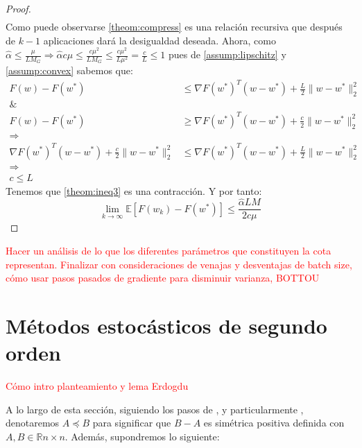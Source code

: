 \documentclass{book}
\theoremstyle{plain}
\theoremstyle{definition}
\theoremstyle{remark}
\begin{document}
\begin{proof}
\begin{equation}
\begin{split}
    \end{split}
\end{equation}
Como puede observarse \ref{theom:compress} es una relación recursiva que después de $k-1$ aplicaciones dará la desigualdad deseada. Ahora, como $\hat{\alpha}\leq\frac{\mu}{L M_G}\Rightarrow \hat{\alpha}c\mu\leq \frac{c\mu^2}{LM_G}\leq\frac{c\mu^2}{L\mu^2}=\frac{c}{L}\leq 1$ pues de \ref{assump:lipschitz} y \ref{assump:convex} sabemos que:
\begin{equation*}
    \begin{split}
    F(w) - F(w^*) & \leq \nabla F(w^*)^T(w-w^*) + \frac{L}{2}\|w - w^*\|_2^2 \\
    \& & \\
    F(w) - F(w^*) & \geq \nabla F(w^*)^T(w-w^*) +  \frac{c}{2}\|w - w^*\|_2^2 \\
    \Rightarrow & \\
    \nabla F(w^*)^T(w-w^*) + \frac{c}{2}\|w - w^*\|_2^2 &\leq \nabla F(w^*)^T(w-w^*) + \frac{L}{2}\|w - w^*\|_2^2 \\
    \Rightarrow & \\
    c \leq L
    \end{split}
\end{equation*}
Tenemos que \ref{theom:ineq3} es una contracción. Y por tanto: \begin{equation}
    \displaystyle\lim_{k\rightarrow\infty}\mathbb{E}[F(w_k)- F(w^*)] \leq \frac{\hat{\alpha}LM}{2c\mu}
\end{equation}
\end{proof}

\textcolor{red}{Hacer un análisis de lo que los diferentes parámetros que constituyen la cota representan. Finalizar con consideraciones de venajas y desventajas de batch size, cómo usar pasos pasados de gradiente para disminuir varianza, BOTTOU}


\chapter{Métodos estocásticos de segundo orden}

\newpage

\textcolor{red}{Cómo intro planteamiento y lema Erdogdu}

A lo largo de esta sección, siguiendo los pasos de \cite{BYRD}, \cite{ROOSTA} y particularmente \cite{BOLLAPRAGADA}, denotaremos $A\preceq B$ para significar que $B-A$ es simétrica positiva definida con $A,B \in \mathbb{R}{n\times n}$. Además, supondremos lo siguiente:
\end{document}
